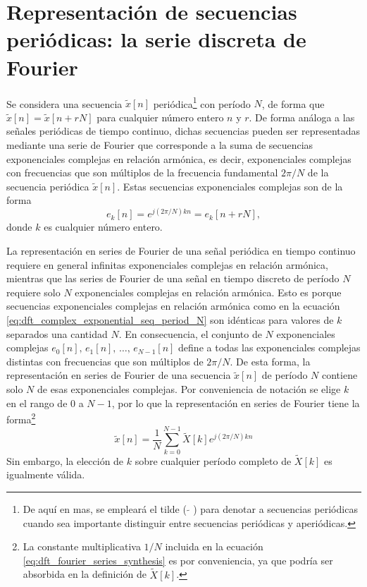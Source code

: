 \documentclass[a4paper]{report}
\begin{document}
\section{Representación de secuencias periódicas: la serie discreta de Fourier}\label{sec:dft_dfs}

Se considera una secuencia \(\tilde{x}[n]\) periódica\footnote{De aquí en mas, se empleará el tilde ( \(\tilde{}\) ) para denotar a secuencias periódicas cuando sea importante distinguir entre secuencias periódicas y aperiódicas.} con período \(N\), de forma que \(\tilde{x}[n]=\tilde{x}[n+rN]\) para cualquier número entero \(n\) y \(r\). De forma análoga a las señales periódicas de tiempo continuo, dichas secuencias pueden ser representadas mediante una serie de Fourier que corresponde a la suma de secuencias exponenciales complejas en relación armónica, es decir, exponenciales complejas con frecuencias que son múltiplos de la frecuencia fundamental \(2\pi/N\) de la secuencia periódica \(\tilde{x}[n]\). Estas secuencias exponenciales complejas son de la forma 
\begin{equation}\label{eq:dft_complex_exponential_seq_period_N}
 e_k[n]=e^{j(2\pi/N)kn}=e_k[n+rN], 
\end{equation}
donde \(k\) es cualquier número entero. 

La representación en series de Fourier de una señal periódica en tiempo continuo requiere en general infinitas exponenciales complejas en relación armónica, mientras que las series de Fourier de una señal en tiempo discreto de período \(N\) requiere solo \(N\) exponenciales complejas en relación armónica. Esto es porque secuencias exponenciales complejas en relación armónica como en la ecuación \ref{eq:dft_complex_exponential_seq_period_N} son idénticas para valores de \(k\) separados una cantidad \(N\). En consecuencia, el conjunto de \(N\) exponenciales complejas \(e_0[n],\,e_1[n],\,\dots,\,e_{N-1}[n]\) define a todas las exponenciales complejas distintas con frecuencias que son múltiplos de \(2\pi/N\). De esta forma, la representación en series de Fourier de una secuencia \(\tilde{x}[n]\) de período \(N\) contiene solo \(N\) de esas exponenciales complejas. Por conveniencia de notación se elige \(k\) en el rango de 0 a \(N-1\), por lo que la representación en series de Fourier tiene la forma\footnote{La constante multiplicativa \(1/N\) incluida en la ecuación \ref{eq:dft_fourier_series_synthesis} es por conveniencia, ya que podría ser absorbida en la definición de \(\tilde{X}[k]\).} 
\begin{equation}\label{eq:dft_fourier_series_synthesis}
 \tilde{x}[n]=\frac{1}{N}\sum_{k=0}^{N-1}\tilde{X}[k]e^{j(2\pi/N)kn}
\end{equation}
Sin embargo, la elección de \(k\) sobre cualquier período completo de \(\tilde{X}[k]\) es igualmente válida.
\end{document}
